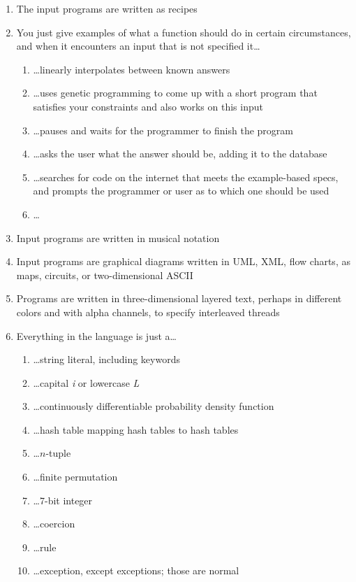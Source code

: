 \documentclass[acmtocl]%
{boviktrans}
\begin{document}
\begin{enumerate}
\item The input programs are written as recipes
\item You just give examples of what a function should do in certain circumstances, and when it encounters an input that is not specified it\ldots
  \begin{enumerate}
    \item \ldots linearly interpolates between known answers
    \item \ldots uses genetic programming to come up with a short program that satisfies your constraints and also works on this input
    \item \ldots pauses and waits for the programmer to finish the program
    \item \ldots asks the user what the answer should be, adding it to the database
    \item \ldots searches for code on the internet that meets the example-based specs, and prompts the programmer or user as to which one should be used
    \item \ldots
  \end{enumerate}
\item Input programs are written in musical notation
\item Input programs are graphical diagrams written in UML, XML, flow charts, as maps, circuits, or two-dimensional ASCII
\item Programs are written in three-dimensional layered text, perhaps in different colors and with alpha channels, to specify interleaved threads
\item Everything in the language is just a\ldots
   \begin{enumerate}
     \item \ldots string literal, including keywords
     \item \ldots capital {\it i} or lowercase {\it L}
     \item \ldots continuously differentiable probability density function
     \item \ldots hash table mapping hash tables to hash tables
     \item \ldots $n$-tuple
     \item \ldots finite permutation
     \item \ldots 7-bit integer
     \item \ldots coercion
     \item \ldots rule
     \item \ldots exception, except exceptions; those are normal

\end{enumerate}
\end{enumerate}
\end{document}
